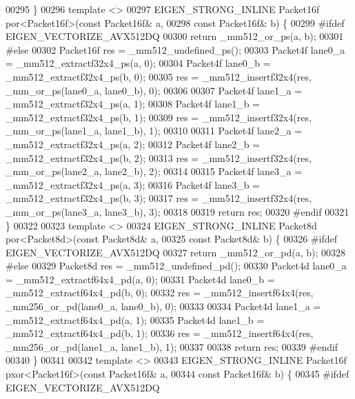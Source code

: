 \begin{DoxyCode}
00295 \}
00296 \textcolor{keyword}{template} <>
00297 EIGEN\_STRONG\_INLINE Packet16f por<Packet16f>(\textcolor{keyword}{const} Packet16f& a,
00298                                              \textcolor{keyword}{const} Packet16f& b) \{
00299 \textcolor{preprocessor}{#ifdef EIGEN\_VECTORIZE\_AVX512DQ}
00300   \textcolor{keywordflow}{return} \_mm512\_or\_ps(a, b);
00301 \textcolor{preprocessor}{#else}
00302   Packet16f res = \_mm512\_undefined\_ps();
00303   Packet4f lane0\_a = \_mm512\_extractf32x4\_ps(a, 0);
00304   Packet4f lane0\_b = \_mm512\_extractf32x4\_ps(b, 0);
00305   res = \_mm512\_insertf32x4(res, \_mm\_or\_ps(lane0\_a, lane0\_b), 0);
00306 
00307   Packet4f lane1\_a = \_mm512\_extractf32x4\_ps(a, 1);
00308   Packet4f lane1\_b = \_mm512\_extractf32x4\_ps(b, 1);
00309   res = \_mm512\_insertf32x4(res, \_mm\_or\_ps(lane1\_a, lane1\_b), 1);
00310 
00311   Packet4f lane2\_a = \_mm512\_extractf32x4\_ps(a, 2);
00312   Packet4f lane2\_b = \_mm512\_extractf32x4\_ps(b, 2);
00313   res = \_mm512\_insertf32x4(res, \_mm\_or\_ps(lane2\_a, lane2\_b), 2);
00314 
00315   Packet4f lane3\_a = \_mm512\_extractf32x4\_ps(a, 3);
00316   Packet4f lane3\_b = \_mm512\_extractf32x4\_ps(b, 3);
00317   res = \_mm512\_insertf32x4(res, \_mm\_or\_ps(lane3\_a, lane3\_b), 3);
00318 
00319   \textcolor{keywordflow}{return} res;
00320 \textcolor{preprocessor}{#endif}
00321 \}
00322 
00323 \textcolor{keyword}{template} <>
00324 EIGEN\_STRONG\_INLINE Packet8d por<Packet8d>(\textcolor{keyword}{const} Packet8d& a,
00325                                            \textcolor{keyword}{const} Packet8d& b) \{
00326 \textcolor{preprocessor}{#ifdef EIGEN\_VECTORIZE\_AVX512DQ}
00327   \textcolor{keywordflow}{return} \_mm512\_or\_pd(a, b);
00328 \textcolor{preprocessor}{#else}
00329   Packet8d res = \_mm512\_undefined\_pd();
00330   Packet4d lane0\_a = \_mm512\_extractf64x4\_pd(a, 0);
00331   Packet4d lane0\_b = \_mm512\_extractf64x4\_pd(b, 0);
00332   res = \_mm512\_insertf64x4(res, \_mm256\_or\_pd(lane0\_a, lane0\_b), 0);
00333 
00334   Packet4d lane1\_a = \_mm512\_extractf64x4\_pd(a, 1);
00335   Packet4d lane1\_b = \_mm512\_extractf64x4\_pd(b, 1);
00336   res = \_mm512\_insertf64x4(res, \_mm256\_or\_pd(lane1\_a, lane1\_b), 1);
00337 
00338   \textcolor{keywordflow}{return} res;
00339 \textcolor{preprocessor}{#endif}
00340 \}
00341 
00342 \textcolor{keyword}{template} <>
00343 EIGEN\_STRONG\_INLINE Packet16f pxor<Packet16f>(\textcolor{keyword}{const} Packet16f& a,
00344                                               \textcolor{keyword}{const} Packet16f& b) \{
00345 \textcolor{preprocessor}{#ifdef EIGEN\_VECTORIZE\_AVX512DQ}

\end{DoxyCode}
